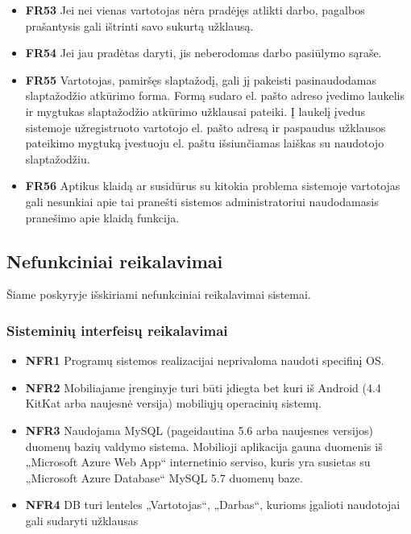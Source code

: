 \documentclass{VUMIFPSbakalaurinis}
\begin{document}
\begin{itemize}
	\item \textbf{FR53} Jei nei vienas vartotojas nėra pradėjęs atlikti darbo, pagalbos prašantysis gali ištrinti savo sukurtą užklausą.
	\item \textbf{FR54} Jei jau pradėtas daryti, jis neberodomas darbo pasiūlymo sąraše.
\end{itemize}

\begin{itemize}
	\item \textbf{FR55} Vartotojas, pamiršęs slaptažodį, gali jį pakeisti pasinaudodamas slaptažodžio atkūrimo forma. Formą sudaro el. pašto adreso įvedimo laukelis ir mygtukas slaptažodžio atkūrimo užklausai pateiki. Į laukelį įvedus sistemoje užregistruoto vartotojo el. pašto adresą ir paspaudus užklausos pateikimo mygtuką įvestuoju el. paštu išsiunčiamas laiškas su naudotojo slaptažodžiu.
\end{itemize}

\begin{itemize}
	\item \textbf{FR56} Aptikus klaidą ar susidūrus su kitokia problema sistemoje vartotojas gali nesunkiai apie tai pranešti sistemos administratoriui naudodamasis pranešimo apie klaidą funkcija.
\end{itemize}

\subsection{Nefunkciniai reikalavimai}
Šiame poskyryje išskiriami nefunkciniai reikalavimai sistemai. 
\subsubsection{Sisteminių interfeisų reikalavimai}
\begin{itemize}
	\item \textbf{NFR1} Programų sistemos realizacijai neprivaloma naudoti specifinį OS.
	\item \textbf{NFR2} Mobiliajame įrenginyje turi būti įdiegta bet kuri iš Android (4.4 KitKat arba naujesnė versija) mobiliųjų operacinių sistemų.
\end{itemize}

\begin{itemize}
	\item \textbf{NFR3} Naudojama MySQL (pageidautina 5.6 arba naujesnes versijos) duomenų bazių valdymo sistema. Mobilioji aplikacija gauna duomenis iš „Microsoft Azure Web App“ internetinio serviso, kuris yra susietas su „Microsoft Azure Database“ MySQL 5.7 duomenų baze.
	\item \textbf{NFR4} DB turi lenteles „Vartotojas“, „Darbas“, kurioms įgalioti naudotojai gali sudaryti užklausas
\end{itemize}
\end{document}
